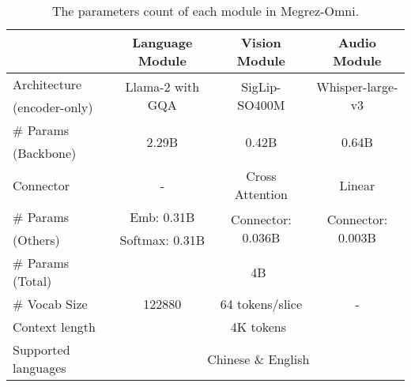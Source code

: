 
   \begin{table}[!ht]
    \centering
    \caption{The parameters count of each module in Megrez-Omni.}
    \label{table:params}
    \begin{tabular}{lccc}
    \toprule
    ~ & Language Module & Vision Module & Audio Module \\
    \midrule
    Architecture & \multirow{2}{*}{Llama-2 with GQA} & \multirow{2}{*}{SigLip-SO400M} & \multirow{2}{*}{Whisper-large-v3} \\
    (encoder-only) & & & \\
    \midrule
    \#  Params & \multirow{2}{*}{2.29B} & \multirow{2}{*}{0.42B} & \multirow{2}{*}{0.64B} \\
    (Backbone) & & & \\
    \midrule
    Connector & - & Cross Attention & Linear \\
    \midrule
    \#  Params & Emb: 0.31B & \multirow{2}{*}{Connector: 0.036B} & \multirow{2}{*}{Connector: 0.003B} \\
    (Others) & Softmax: 0.31B & & \\
    \midrule
    \# Params (Total) & \multicolumn{3}{c}{4B} \\
    \midrule
    \# Vocab Size & 122880 & 64 tokens/slice & - \\
    \midrule
    Context length & \multicolumn{3}{c}{4K tokens} \\
    \midrule
    Supported languages & \multicolumn{3}{c}{Chinese \& English}    \\
    \bottomrule
    \end{tabular}
    \end{table}